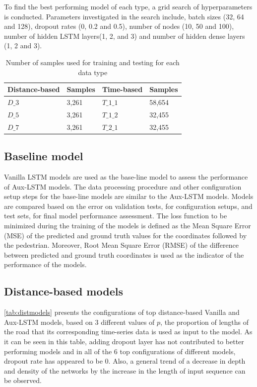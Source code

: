 To find the best performing model of each type, a grid search of hyperparameters is conducted. Parameters investigated in the search include, batch sizes (32, 64 and 128), dropout rates (0, 0.2 and 0.5), number of nodes (10, 50 and 100), number of hidden LSTM layers(1, 2, and 3) and number of hidden dense layers (1, 2 and 3).     
\begin{table}
\centering
\caption{Number of samples used for training and testing for each data type}
\begin{tabular}{|ll||ll|}
\hline
\textbf{Distance-based} & \textbf{Samples} & \textbf{Time-based} & \textbf{Samples} \\ \hline
$D\_3$                     & 3,261             & $T\_1\_1$               & 58,654            \\ \hline
$D\_5$                     & 3,261             & $T\_1\_2$               & 32,455            \\ \hline
$D\_7$                     & 3,261             & $T\_2\_1$               & 32,455            \\ \hline
\end{tabular}
\label{tab:datasize}
\end{table}

\subsection{Baseline model}
Vanilla LSTM models are used as the base-line model to assess the performance of Aux-LSTM models. The data processing procedure and other configuration setup steps for the base-line models are similar to the Aux-LSTM models. Models are compared based on the error on validation tests, for configuration setups, and test sets, for final model performance assessment. The loss function to be minimized during the training of the models is defined as the Mean Square Error (MSE) of the predicted and ground truth values for the coordinates followed by the pedestrian. Moreover, Root Mean Square Error (RMSE) of the difference between predicted and ground truth coordinates is used as the indicator of the performance of the models.  
\subsection{Distance-based models}
\cref{tab:distmodels} presents the configurations of top distance-based Vanilla and Aux-LSTM models, based on 3 different values of $p$, the proportion of lengths of the road that its corresponding time-series data is used as input to the model. As it can be seen in this table, adding dropout layer has not contributed to better performing models and in all of the 6 top configurations of different models, dropout rate has appeared to be 0. Also, a general trend of a decrease in depth and density of the networks by the increase in the length of input sequence can be observed.  

